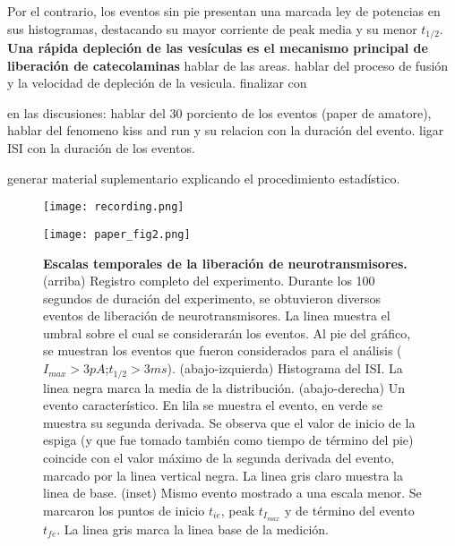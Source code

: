 \documentclass[twocolumn]{article}
\begin{document}
Por el contrario, los eventos sin pie presentan una marcada ley de potencias en sus histogramas, destacando su mayor corriente de peak media y su menor $t_{1/2}$.
{\bf Una rápida depleción de las vesículas es el mecanismo principal de liberación de catecolaminas}
hablar de las areas.  hablar del proceso de fusión y la velocidad de depleción de la vesicula.
finalizar con 

en las discusiones: hablar del 30 porciento de los eventos (paper de amatore), hablar del fenomeno kiss and run y su relacion con la duración del evento. ligar ISI con la duración de los eventos.

generar material suplementario explicando el procedimiento estadístico.


\begin{figure*}[h!]
\centering
\texttt{[image: recording.png]} 
\end{figure*}
\begin{figure*}[h!]
\centering
\texttt{[image: paper\_fig2.png]} 
\caption{{\bf Escalas temporales de la liberación de neurotransmisores.} (arriba) Registro completo del experimento. Durante los 100 segundos de duración del experimento, se obtuvieron diversos eventos de liberación de neurotransmisores.  La linea muestra el umbral sobre el cual se considerarán los eventos.  Al pie del gráfico, se muestran los eventos que fueron considerados para el análisis ($I_{max}>3pA$;$t_{1/2}>3ms$).
(abajo-izquierda) Histograma del ISI. La linea negra marca la media de la distribución. (abajo-derecha) Un evento característico.  En lila se muestra el evento, en verde se muestra su segunda derivada.  Se observa que el valor de inicio de la espiga (y que fue tomado también como tiempo de término del pie) coincide con el valor máximo de la segunda derivada del evento, marcado por la linea vertical negra.  La linea gris claro muestra la linea de base. (inset) Mismo evento mostrado a una escala menor.  Se marcaron los puntos de inicio $t_{ie}$, peak $t_{I_{max}}$ y de término del evento $t_{fe}$. La linea gris marca la linea base de la medición.}    
\label{fig:figura1}
\end{figure*}
\end{document}
